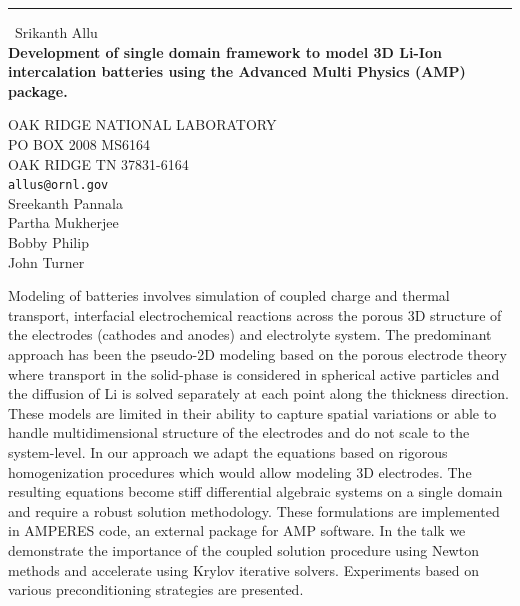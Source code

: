 \documentclass{report}
\begin{document}
\begin{center}
\rule{6in}{1pt} \
{\large Srikanth Allu \\
{\bf Development of single domain framework to model 3D Li-Ion intercalation batteries using the Advanced Multi Physics (AMP) package. }}

OAK RIDGE NATIONAL LABORATORY \\ PO BOX 2008 MS6164 \\ OAK RIDGE TN 37831-6164
\\
{\tt allus@ornl.gov}\\
Sreekanth Pannala \\
Partha Mukherjee\\
Bobby Philip\\
John Turner\end{center}

Modeling of batteries involves simulation of coupled charge and thermal
transport, interfacial electrochemical reactions across the porous 3D
structure of the electrodes (cathodes and anodes) and electrolyte system.
The predominant approach has been the pseudo-2D modeling based on the
porous electrode theory where transport in the solid-phase is considered
in spherical active particles and the diffusion of Li is solved
separately at each point along the thickness direction. These models are
limited in their ability to capture spatial variations or able to handle
multidimensional structure of the electrodes and do not scale to the
system-level. In our approach we adapt the equations based on rigorous
homogenization procedures which would allow modeling 3D electrodes. The
resulting equations become stiff differential algebraic systems on a
single domain and require a robust solution methodology. These
formulations are implemented in AMPERES code, an external package for AMP
software. In the talk we demonstrate the importance of the coupled
solution procedure using Newton methods and accelerate using Krylov
iterative solvers. Experiments based on various preconditioning
strategies are presented.
\end{document}

